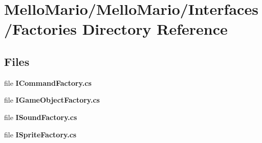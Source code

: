 \section{Mello\+Mario/\+Mello\+Mario/\+Interfaces/\+Factories Directory Reference}
\label{dir_1fbd9867465e2e87db3ec2929f8cc4f0}
\subsection*{Files}
\begin{DoxyCompactItemize}
\item 
file \textbf{ I\+Command\+Factory.\+cs}
\item 
file \textbf{ I\+Game\+Object\+Factory.\+cs}
\item 
file \textbf{ I\+Sound\+Factory.\+cs}
\item 
file \textbf{ I\+Sprite\+Factory.\+cs}
\end{DoxyCompactItemize}
